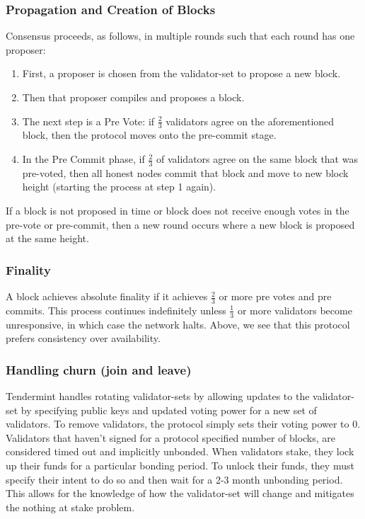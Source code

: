 \documentclass[10pt,journal,compsoc]{IEEEtran}
\begin{document}
\subsubsection{Propagation and Creation of Blocks}
Consensus proceeds, as follows, in multiple rounds such that each round has one proposer:
\begin{enumerate}
    \item First, a proposer is chosen from the validator-set to propose a new block.
    \item Then that proposer compiles and proposes a block.
    \item The next step is a Pre Vote: if \(\frac{2}{3}\) validators agree on the aforementioned block, then the protocol moves onto the pre-commit stage.
    \item In the Pre Commit phase, if \(\frac{2}{3}\) of validators agree on the same block that was pre-voted, then all honest nodes commit that block and move to new block height (starting the process at step 1 again).
\end{enumerate}
If a block is not proposed in time or block does not receive enough votes in the pre-vote or pre-commit, then a new round occurs where a new block is proposed at the same height.

\subsubsection{Finality}
A block achieves absolute finality if it achieves \(\frac{2}{3}\) or more pre votes and pre commits. This process continues indefinitely unless \(\frac{1}{3}\) or more validators become unresponsive, in which case the network halts. Above, we see that this protocol prefers consistency over availability.

\subsubsection{Handling churn (join and leave)}
Tendermint handles rotating validator-sets by allowing updates to the validator-set by specifying public keys and updated voting power for a new set of validators. To remove validators, the protocol simply sets their voting power to 0. Validators that haven't signed for a protocol specified number of blocks, are considered timed out and implicitly unbonded. When validators stake, they lock up their funds for a particular bonding period. To unlock their funds, they must specify their intent to do so and then wait for a 2-3 month unbonding period. This allows for the knowledge of how the validator-set will change and mitigates the nothing at stake problem.
\end{document}
